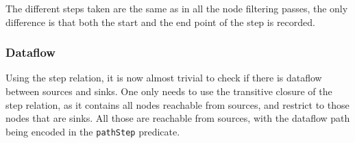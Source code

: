 The different steps taken are the same as in all the node filtering passes,
the only difference is that both the start and the end point of the step is 
recorded.

\subsubsection*{Dataflow}
Using the step relation, it is now almost trivial to check if there is dataflow 
between sources and sinks.
One only needs to use the transitive closure of the step relation, as it contains 
all nodes reachable from sources, and restrict to those nodes that are sinks.
All those are reachable from sources, with the dataflow path being encoded in the 
\texttt{pathStep} predicate.












